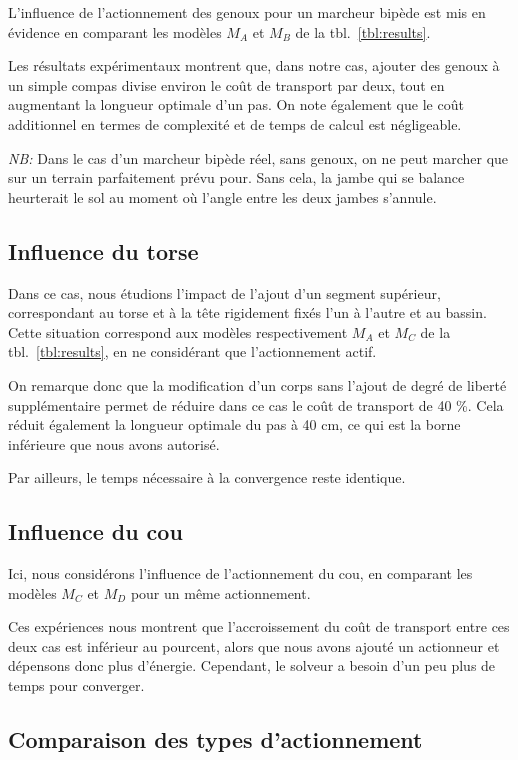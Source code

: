 \documentclass[french,A4paper,]{book}
\begin{document}
L'influence de l'actionnement des genoux pour un marcheur bipède est mis
en évidence en comparant les modèles \(M_A\) et \(M_B\) de la
tbl.~\ref{tbl:results}.

Les résultats expérimentaux montrent que, dans notre cas, ajouter des
genoux à un simple compas divise environ le coût de transport par deux,
tout en augmentant la longueur optimale d'un pas. On note également que
le coût additionnel en termes de complexité et de temps de calcul est
négligeable.

\emph{NB:} Dans le cas d'un marcheur bipède réel, sans genoux, on ne
peut marcher que sur un terrain parfaitement prévu pour. Sans cela, la
jambe qui se balance heurterait le sol au moment où l'angle entre les
deux jambes s'annule.

\subsection{Influence du torse}\label{influence-du-torse}

Dans ce cas, nous étudions l'impact de l'ajout d'un segment supérieur,
correspondant au torse et à la tête rigidement fixés l'un à l'autre et
au bassin. Cette situation correspond aux modèles respectivement \(M_A\)
et \(M_C\) de la tbl.~\ref{tbl:results}, en ne considérant que
l'actionnement actif.

On remarque donc que la modification d'un corps sans l'ajout de degré de
liberté supplémentaire permet de réduire dans ce cas le coût de
transport de 40 \%. Cela réduit également la longueur optimale du pas à
40 cm, ce qui est la borne inférieure que nous avons autorisé.

Par ailleurs, le temps nécessaire à la convergence reste identique.

\subsection{Influence du cou}\label{influence-du-cou}

Ici, nous considérons l'influence de l'actionnement du cou, en comparant
les modèles \(M_C\) et \(M_D\) pour un même actionnement.

Ces expériences nous montrent que l'accroissement du coût de transport
entre ces deux cas est inférieur au pourcent, alors que nous avons
ajouté un actionneur et dépensons donc plus d'énergie. Cependant, le
solveur a besoin d'un peu plus de temps pour converger.

\subsection{Comparaison des types
d'actionnement}\label{comparaison-des-types-dactionnement}
\end{document}
